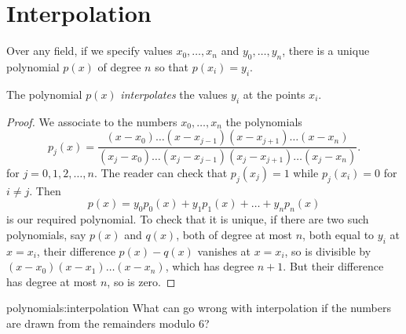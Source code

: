 \section{Interpolation}

\begin{theorem}
Over any field, if we specify values \(x_0, \dots, x_n\) and \(y_0, \dots, y_n\), there is a unique polynomial \(p(x)\) of degree \(n\) so that \(p(x_i)=y_i\).
\end{theorem}
The polynomial \(p(x)\) \emph{interpolates} the values \(y_i\) at the points \(x_i\).
\begin{proof}
We associate to the numbers \(x_0, \dots, x_n\) the polynomials
\[
p_j(x)=
\frac{(x-x_0)\dots(x-x_{j-1})(x-x_{j+1})\dots(x-x_n)}{(x_j-x_0)\dots(x_j-x_{j-1})(x_j-x_{j+1})\dots(x_j-x_n)}.
\]
for \(j=0,1,2,\dots,n\).
The reader can check that \(p_j(x_j)=1\) while \(p_j(x_i)=0\) for \(i \ne j\).
Then 
\[
p(x)=
y_0 p_0(x) + y_1 p_1(x) + \dots + y_n p_n(x)
\]
is our required polynomial.
To check that it is unique, if there are two such polynomials, say \(p(x)\) and \(q(x)\), both of degree at most \(n\), both equal to \(y_i\) at \(x=x_i\), their difference \(p(x)-q(x)\) vanishes at \(x=x_i\), so is divisible by \((x-x_0)(x-x_1)\dots(x-x_n)\), which has degree \(n+1\).
But their difference has degree at most \(n\), so is zero.
\end{proof}

\begin{problem}{polynomials:interpolation}
What can go wrong with interpolation if the numbers are drawn from the remainders modulo 6?
\end{problem}

